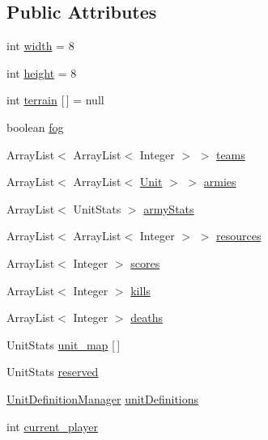 \subsection*{Public Attributes}
\begin{DoxyCompactItemize}
\item 
int \hyperlink{classrts_1_1_physical_game_state_a8b28b7b9a0a7bc72d9de75f85ecc6063}{width} = 8
\item 
int \hyperlink{classrts_1_1_physical_game_state_a5703d32962637e69a729bf812e66e4bd}{height} = 8
\item 
int \hyperlink{classrts_1_1_physical_game_state_a8e0042b4d0c50b1de4bd7bec64a4de4f}{terrain} \mbox{[}$\,$\mbox{]} = null
\item 
boolean \hyperlink{classrts_1_1_physical_game_state_a65777e188928a93d3317197a70b8469e}{fog}
\item 
ArrayList$<$ ArrayList$<$ Integer $>$ $>$ \hyperlink{classrts_1_1_physical_game_state_a8857fe0f0d854ccb4c49661eca1bff20}{teams}
\item 
ArrayList$<$ ArrayList$<$ \hyperlink{classrts_1_1units_1_1_unit}{Unit} $>$ $>$ \hyperlink{classrts_1_1_physical_game_state_a3ac864942771e62fb0ae8f67e8b05689}{armies}
\item 
ArrayList$<$ UnitStats $>$ \hyperlink{classrts_1_1_physical_game_state_ad7679ca58d8e264c2564fe6f2583612c}{armyStats}
\item 
ArrayList$<$ ArrayList$<$ Integer $>$ $>$ \hyperlink{classrts_1_1_physical_game_state_a1b39784d01283e14e116acb012030036}{resources}
\item 
ArrayList$<$ Integer $>$ \hyperlink{classrts_1_1_physical_game_state_a100aac0c47d8f32810edc443624ef951}{scores}
\item 
ArrayList$<$ Integer $>$ \hyperlink{classrts_1_1_physical_game_state_afa9214b286e0460666120fa20d8d17a1}{kills}
\item 
ArrayList$<$ Integer $>$ \hyperlink{classrts_1_1_physical_game_state_a0571840305c2f0fe37472f4c7cad53fd}{deaths}
\item 
UnitStats \hyperlink{classrts_1_1_physical_game_state_aee1ef53ce8876e09956f363ff4a35017}{unit\_\-map} \mbox{[}$\,$\mbox{]}
\item 
UnitStats \hyperlink{classrts_1_1_physical_game_state_aaf605aca11050ce864c61502afe8f023}{reserved}
\item 
\hyperlink{classrts_1_1units_1_1_unit_definition_manager}{UnitDefinitionManager} \hyperlink{classrts_1_1_physical_game_state_a3be9fa0f8cf400886b7e817ceb6071dc}{unitDefinitions}
\item 
int \hyperlink{classrts_1_1_physical_game_state_aba5e892341302f7278d8b6133f194c90}{current\_\-player}
\end{DoxyCompactItemize}

